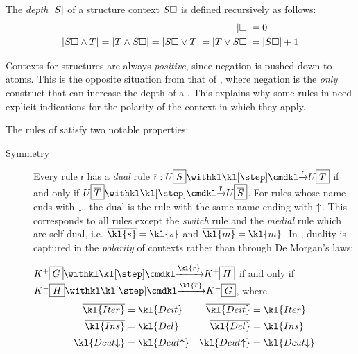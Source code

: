 \begin{scope}
\begin{definition}[Depth]
  The \emph{depth} $\left|S\right|$ of a structure context $S\square$ is defined
  recursively as follows:
  \begin{align*}
    \left|\square\right| &= 0 \\
    \left|S\square \land T\right| = \left|T \land S\square\right| = \left|S\square \lor T\right| = \left|T \lor S\square\right| &= \left|S\square\right| + 1
  \end{align*}
\end{definition}

\begin{remark}
  Contexts for structures are always \emph{positive}, since negation is pushed
down to atoms. This is the opposite situation from that of , where
negation is the \emph{only} construct that can increase the depth of a .
This explains why some rules in  need explicit indications for the
polarity of the context in which they apply.
\end{remark}

The rules of  satisfy two notable properties:
\begin{description}
  \item[Symmetry] 
    Every rule $\mathsf{r}$ has a \emph{dual} rule $\dmdual{\mathsf{r}} :
    U\select{S} \xstep{\mathsf{r}} U\select{T}$ if and only if
    $U\select{\dmdual{T}} \xstep{\dmdual{\mathsf{r}}} U\select{\dmdual{S}}$. For
    rules whose name ends with $\downarrow$, the dual is the rule with the same name
    ending with $\uparrow$. This corresponds to all rules except the \emph{switch}
    rule  and the \emph{medial} rule  which are self-dual, i.e.
    $\dmdual{\kl{s}} = \kl{s}$ and $\dmdual{\kl{m}} = \kl{m}$. In ,
    duality is captured in the \emph{polarity} of contexts rather than through
    De Morgan's laws:
    
    \begin{fact}[Duality]
      $K^+\select{G} \xstep{\kl{r}} K^+\select{H}$
      if and only if $K^-\select{H} \xstep{\kl{\dmdual{r}}} K^-\select{G}$, where
      \begin{align*}
        \dmdual{\kl{Iter}} &= \kl{Deit} & \dmdual{\kl{Deit}} &= \kl{Iter} \\
        \dmdual{\kl{Ins}} &= \kl{Del} & \dmdual{\kl{Del}} &= \kl{Ins} \\
        \dmdual{\kl{Dcut{\da}}} &= \kl{Dcut{\ua}} & \dmdual{\kl{Dcut{\ua}}} &= \kl{Dcut{\da}}
      \end{align*}
    \end{fact}


\end{description}
\end{scope}
